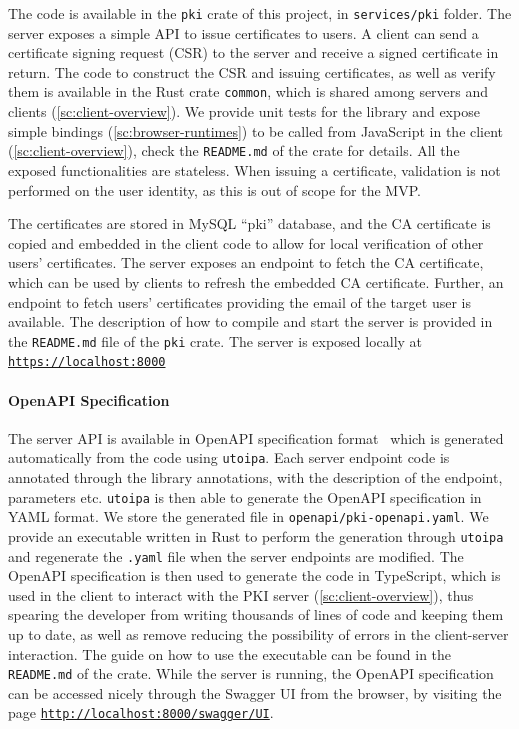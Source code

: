 The code is available in the \texttt{pki} crate
of this project, in \texttt{services/pki} folder.
The server exposes a simple API
to issue certificates to users. 
A client can send a certificate signing request (CSR)
to the server and receive a signed certificate in return.
The code to construct the CSR and issuing certificates, as well as 
verify them is available in the Rust crate \texttt{common},
which is shared among servers and clients (\cref{sc:client-overview}).
We provide unit tests for the library and expose simple bindings (\cref{sc:browser-runtimes}) to be
called from JavaScript in the client (\cref{sc:client-overview}), check the \texttt{README.md}
of the crate for details. All the exposed functionalities are stateless.
When issuing a certificate, validation is not performed
on the user identity, as this is out of scope for the MVP.

The certificates are stored in MySQL ``pki'' database, and the CA
certificate is copied and embedded in the client code to allow
for local verification of other users' certificates.
The server exposes an endpoint to fetch the
CA certificate, which can be used by clients to
refresh the embedded CA certificate.
Further, an endpoint to fetch users' certificates providing the
email of the target user is available.
The description of how to compile and start the server is
provided in the \texttt{README.md} file of the \texttt{pki} crate.
The server is exposed locally at \texttt{\url{https://localhost:8000}}



\paragraph{OpenAPI Specification}
The server API is available in OpenAPI
specification format~\cite{OpenAPISurvey} 
which is generated automatically from the code using
\texttt{utoipa}. Each server endpoint code is
annotated through the library annotations, with the description
of the endpoint, parameters etc. \texttt{utoipa} is then
able to generate the OpenAPI specification in YAML format.
We store the generated file in \texttt{openapi/pki-openapi.yaml}.
We provide an executable written in Rust to perform the generation
through \texttt{utoipa} and regenerate the \texttt{.yaml}
file when the server endpoints are modified.
The OpenAPI specification is then used to generate the
code in TypeScript, which is used in the client to interact
with the PKI server (\cref{sc:client-overview}), thus spearing
the developer from writing thousands of lines of code and keeping them up to date, 
as well as remove reducing the possibility of errors in the client-server interaction. 
The guide on how to use the executable can be found in the \texttt{README.md}
of the crate.
While the server is running, the OpenAPI specification can be
accessed nicely through the Swagger UI from the browser, 
by visiting the page \texttt{\url{http://localhost:8000/swagger/UI}}.

